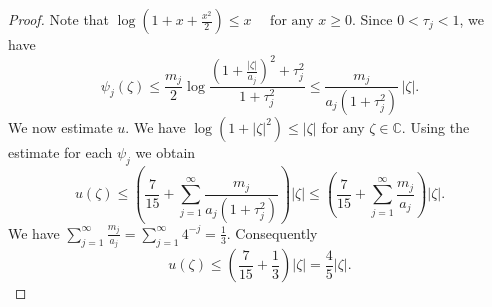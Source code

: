 \documentclass[10pt,a4paper]{amsart}
\newcommand{\C}{\mathbb C}
\begin{document}
\begin{proof} Note that
$\log(1+x+\frac{x^2}{2})\le x\quad\text{ for any }x\ge0$. Since $0<\tau_j<1$, we have
\[
 \psi_j(\zeta)
 \le \frac{m_j}{2}
 \log\frac{(1+\frac{|\zeta|}{a_j})^2+\tau_j^2}{1+\tau_j^2}\le \frac{m_j}{a_j(1+\tau_j^2)}\,|\zeta|.
\]
We now estimate $u$. We have  
$\log(1+|\zeta|^2)\le |\zeta|$ for any $\zeta\in\C$.
Using the estimate for each $\psi_j$ we obtain
$$ 
u(\zeta)
 \le \left(
 \frac{7}{15}
 +\sum_{j=1}^{\infty}
 \frac{m_j}{a_j(1+\tau_j^2)}
 \right)|\zeta|\le \left(
 \frac{7}{15}
 +\sum_{j=1}^{\infty}\frac{m_j}{a_j}
 \right)|\zeta|.
$$
We have $\sum_{j=1}^{\infty}\frac{m_j}{a_j}
 =\sum_{j=1}^{\infty}4^{-j}=\frac13$.
Consequently
\[
 u(\zeta)\le
 \left(\frac{7}{15}+\frac13\right)|\zeta|
 =\frac45|\zeta|.
\]
\end{proof}
\end{document}
